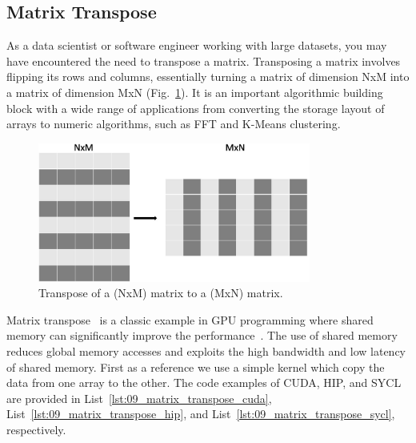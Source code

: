 

\subsection{Matrix Transpose}\label{subsection:matrix_transpose}


\par
As a data scientist or software engineer working with large datasets, you may have encountered the need to transpose a matrix.
Transposing a matrix involves flipping its rows and columns, essentially turning a matrix of dimension NxM into a matrix of dimension MxN (Fig.~\ref{fig:matrix_transpose}).
It is an important algorithmic building block with a wide range of applications from converting the storage layout of arrays to numeric algorithms, such as FFT and K-Means clustering.


\begin{figure}[htbp]
\centering\includegraphics[width=0.8\textwidth]{fig_problem/matrix_transpose_2d.jpg}
\caption{Transpose of a (NxM) matrix to a (MxN) matrix.}\label{fig:matrix_transpose}
\end{figure}


\par
Matrix transpose~\cite{matrix_transpose} is a classic example in GPU programming where shared memory can significantly improve the performance~\cite{matrix_transpose_efficient, matrix_transpose_advanced}.
The use of shared memory reduces global memory accesses and exploits the high bandwidth and low latency of shared memory.
First as a reference we use a simple kernel which copy the data from one array to the other.
The code examples of CUDA, HIP, and SYCL are provided in List~\ref{lst:09_matrix_transpose_cuda}, List~\ref{lst:09_matrix_transpose_hip}, and List~\ref{lst:09_matrix_transpose_sycl}, respectively.





